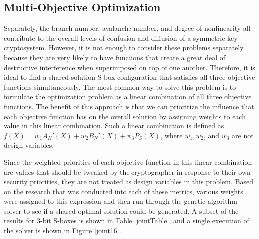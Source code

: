 \documentclass[11pt]{article}
\begin{document}
\subsection{Multi-Objective Optimization}
Separately, the branch number, avalanche number, and degree of nonlinearity all contribute to the overall levels of confusion and diffusion of a symmetric-key cryptosystem. However, it is not enough to consider these problems separately because they are very likely to have functions that create a great deal of destructive interference when superimposed on top of one another. Therefore, it is ideal to find a shared solution S-box configuration that satisfies all three objective functions simultaneously. The most common way to solve this problem is to formulate the optimization problem as a linear combination of all three objective functions. The benefit of this approach is that we can prioritize the influence that each objective function has on the overall solution by assigning weights to each value in this linear combination. Such a linear combination is defined as $f(X) = w_1A_N'(X) + w_2B_N'(X) + w_3P_S(X)$, where $w_1, w_2$, and $w_3$ are not design variables. 

Since the weighted priorities of each objective function in this linear combination are values that should be tweaked by the cryptographer in response to their own security priorities, they are not treated as design variables in this problem. Based on the research that was conducted into each of these metrics, various weights were assigned to this expression and then run through the genetic algorithm solver to see if a shared optimal solution could be generated. A subset of the results for $3$-bit S-boxes is shown in Table \ref{jointTable}, and a single execution of the solver is shown in Figure \ref{joint16}.
\end{document}
